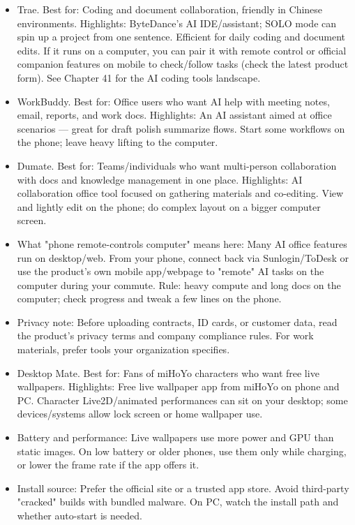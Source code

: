 \begin{itemize}
  \item Trae. Best for: Coding and document collaboration, friendly in Chinese environments. Highlights: ByteDance's AI IDE/assistant; SOLO mode can spin up a project from one sentence. Efficient for daily coding and document edits. If it runs on a computer, you can pair it with remote control or official companion features on mobile to check/follow tasks (check the latest product form). See Chapter 41 for the AI coding tools landscape.
  \item WorkBuddy. Best for: Office users who want AI help with meeting notes, email, reports, and work docs. Highlights: An AI assistant aimed at office scenarios — great for draft polish summarize flows. Start some workflows on the phone; leave heavy lifting to the computer.
  \item Dumate. Best for: Teams/individuals who want multi-person collaboration with docs and knowledge management in one place. Highlights: AI collaboration office tool focused on gathering materials and co-editing. View and lightly edit on the phone; do complex layout on a bigger computer screen.
  \item What "phone remote-controls computer" means here: Many AI office features run on desktop/web. From your phone, connect back via Sunlogin/ToDesk or use the product's own mobile app/webpage to "remote" AI tasks on the computer during your commute. Rule: heavy compute and long docs on the computer; check progress and tweak a few lines on the phone.
  \item Privacy note: Before uploading contracts, ID cards, or customer data, read the product's privacy terms and company compliance rules. For work materials, prefer tools your organization specifies.
\end{itemize}


\begin{itemize}
  \item Desktop Mate. Best for: Fans of miHoYo characters who want free live wallpapers. Highlights: Free live wallpaper app from miHoYo on phone and PC. Character Live2D/animated performances can sit on your desktop; some devices/systems allow lock screen or home wallpaper use.
  \item Battery and performance: Live wallpapers use more power and GPU than static images. On low battery or older phones, use them only while charging, or lower the frame rate if the app offers it.
  \item Install source: Prefer the official site or a trusted app store. Avoid third-party "cracked" builds with bundled malware. On PC, watch the install path and whether auto-start is needed.
\end{itemize}

